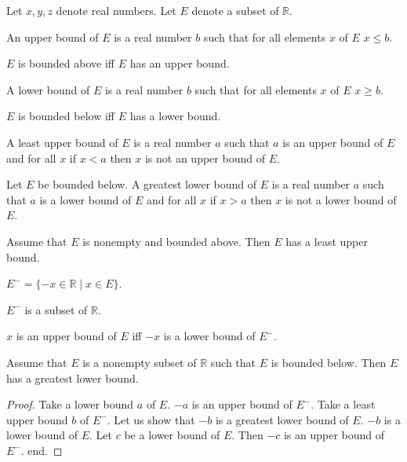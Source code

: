 \documentclass{article}
\begin{document}
\begin{forthel}
Let $x,y,z$ denote real numbers.
Let $E$ denote a subset of $\mathbb{R}$.

\begin{definition}[title=1 7]
An upper bound of $E$ is a
real number $b$ such that for all elements $x$ of $E$ $x \leq b$.
\end{definition}

\begin{definition}[title=1 7a]
$E$ is bounded above iff
$E$ has an upper bound.
\end{definition}

\begin{definition}[title=1 7b]
A lower bound of $E$ is a
real number $b$ such that for all elements $x$ of $E$ $x \geq b$.
\end{definition}

\begin{definition}[title=1 7c]
$E$ is bounded below iff
$E$ has a lower bound.
\end{definition}

\begin{definition}[title=1 8]
A least upper bound of $E$ is a real number $a$ such that
$a$ is an upper bound of $E$ and for all $x$ if $x < a$ then $x$
is not an upper bound of $E$.
\end{definition}

\begin{definition}[title=1 8a]
Let $E$ be bounded below.
A greatest lower bound of $E$ is a real number $a$ such that
$a$ is a lower bound of $E$ and for all $x$ if $x > a$ then $x$ is
not a lower bound of $E$.
\end{definition}

\begin{axiom}[title=1 19]
Assume that $E$ is nonempty and bounded above.
Then $E$ has a least upper bound.
\end{axiom}

\begin{definition}
$E^- = \{-x \in \mathbb{R} \mid x \in E\}$.
\end{definition}

\begin{lemma}
$E^-$ is a subset of $\mathbb{R}$.
\end{lemma}

\begin{lemma}
$x$ is an upper bound of $E$ iff $-x$ is a lower bound of $E^-$.
\end{lemma}

\begin{theorem}[title=1 11] Assume that $E$ is a nonempty subset of $\mathbb{R}$
such that $E$ is bounded below.
Then $E$ has a greatest lower bound.\end{theorem}
\begin{proof}
Take a lower bound $a$ of $E$.
$-a$ is an upper bound of $E^-$.
Take a least upper bound $b$ of $E^-$.
Let us show that $-b$ is a greatest lower bound of $E$.
$-b$ is a lower bound of $E$. Let $c$ be a lower bound of $E$.
Then $-c$ is an upper bound of $E^-$.
end.
\end{proof}

\end{forthel}
\end{document}
